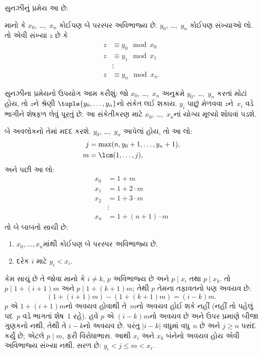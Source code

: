 સુનઝીનું પ્રમેય આ છે:
\begin{thm}
માનો કે $x_0$, \dots,~$x_n$
કોઈપણ બે પરસ્પર અવિભાજ્ય છે.
$y_0$, \dots,~$y_n$ કોઈપણ
સંખ્યાઓ લો. તો એવી સંખ્યા $z$
છે કે
\begin{align*}
z & \equiv y_0 \mod x_0 \\
z & \equiv y_1 \mod x_1 \\
& \vdots  \\
z & \equiv y_n \mod x_n.
\end{align*}
\end{thm}

સુનઝીના પ્રમેયનો ઉપયોગ આમ કરીશું:
જો $x_0$, \dots,~$x_n$ અનુક્રમે
$y_0$, \dots,~$y_n$ કરતાં મોટાં
હોય, તો $z$ને શ્રેણી
$\tuple{y_0, \dots,y_n}$નો
સંકેત લઈ શકાય. $y_i$ પાછું
મેળવવા $z$ને~$x_i$ વડે ભાગીને
શેષફળ લેવું પૂરતું છે. આ
સંકેતીકરણ માટે $x_0$,
\dots,~$x_n$નાં યોગ્ય મૂલ્યો
શોધવાં પડશે.

બે અવલોકનો તેમાં મદદ કરશે.
$y_0$, \dots,~$y_n$ આપેલાં હોય,
તો આ લો:
\begin{align*}
j &= \max(n, y_0 + 1, \dots, y_n + 1), \\
m &= \lcm(1,\dots,j),
\end{align*}
અને પછી આ લો:
\begin{align*}
x_0 & = 1 + m \\
x_1 & = 1 + 2 \cdot m \\
x_2 & = 1 + 3 \cdot m \\
& \vdots  \\
x_n & = 1 + (n+1) \cdot m
\end{align*}
તો બે બાબતો સાચી છે:
\begin{enumerate}
\item{} $x_0,\dots,x_n$માંથી કોઈપણ બે પરસ્પર અવિભાજ્ય છે.
\item{} દરેક $i$ માટે $y_i < x_i$.
\end{enumerate}
 કેમ સાચું છે તે
જોવા માનો કે $i\ne k$, $p$ અવિભાજ્ય
છે અને
$p \mid x_i$ તથા $p \mid x_k$.
તો $p \mid 1 + (i+1) m$ અને
$p \mid 1 + (k+1) m$; તેથી $p$
તેમના તફાવતનો પણ અવયવ છે:
\[
(1 + (i+1)m) - (1+ (k+1)m) = (i-k) m.
\]
$p$ એ $1 + (i+1)m$નો અવયવ
હોવાથી તે~$m$નો અવયવ હોઈ
શકે નહીં (નહીં તો પહેલું પદ~$p$
વડે ભાગતાં શેષ~$1$ રહે).
હવે $p$ એ $(i-k)m$નો અવયવ
છે અને ઉપર પ્રમાણે બીજા
ગુણકનો નથી, તેથી તે
$i-k$નો અવયવ છે. પરંતુ
$\left|i-k\right|$ વધુમાં વધુ~$n$
છે અને $j \geq n$ પસંદ કર્યું છે;
એટલે $p \mid m$, ફરી વિરોધાભાસ.
આથી $x_i$ અને $x_k$ બંનેનો
અવયવ હોય એવી અવિભાજ્ય સંખ્યા નથી.
 સરળ છે:
$y_i < j \leq m < x_i$.

